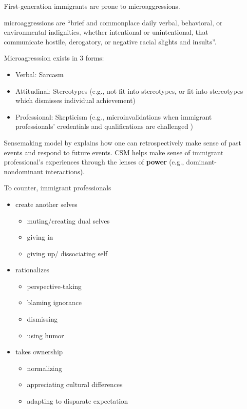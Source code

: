 \documentclass[
]{book}
\providecommand{\tightlist}{%
  \setlength{\itemsep}{0pt}\setlength{\parskip}{0pt}}
\begin{document}
\citep{Shenoy_Packer_2014}

First-generation immigrants are prone to microaggressions.

microaggressions are ``brief and commonplace daily verbal, behavioral, or environmental indignities, whether intentional
or unintentional, that communicate hostile, derogatory, or negative racial slights and insults''. \citep{Sue_2007}

Microagresssion exists in 3 forms:

\begin{itemize}
\tightlist
\item
  Verbal: Sarcasm
\item
  Attitudinal: Stereotypes (e.g., not fit into stereotypes, or fit into stereotypes which dismisses individual
  achievement)\\
\item
  Professional: Skepticism (e.g., microinvalidations when immigrant professionals' credentials and qualifications are
  challenged )
\end{itemize}

Sensemaking model by \citep{Weick_1995} explains how one can retrospectively make sense of past events and respond to future
events. CSM helps make sense of immigrant professional's experiences through the lenses of \textbf{power} (e.g.,
dominant-nondominant interactions).

To counter, immigrant professionals

\begin{itemize}
\item
  create another selves

  \begin{itemize}
  \tightlist
  \item
    muting/creating dual selves
  \item
    giving in
  \item
    giving up/ dissociating self
  \end{itemize}
\item
  rationalizes

  \begin{itemize}
  \tightlist
  \item
    perspective-taking
  \item
    blaming ignorance
  \item
    dismissing
  \item
    using humor
  \end{itemize}
\item
  takes ownership

  \begin{itemize}
  \tightlist
  \item
    normalizing
  \item
    appreciating cultural differences
  \item
    adapting to disparate expectation
  \end{itemize}
\end{itemize}
\end{document}
